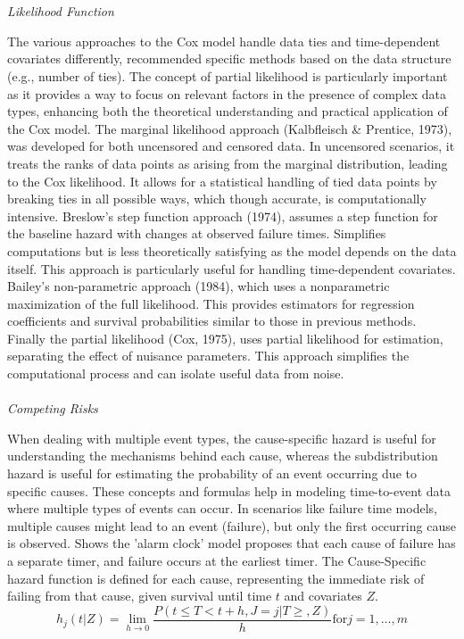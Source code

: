 \\\\
\textit{Likelihood Function}
\par \noindent The various approaches to the Cox model handle data ties and time-dependent covariates differently, \parencite{kalbfleisch_fifty_2023} recommended specific methods based on the data structure (e.g., number of ties). The concept of partial likelihood is particularly important as it provides a way to focus on relevant factors in the presence of complex data types, enhancing both the theoretical understanding and practical application of the Cox model. The marginal likelihood approach \parencite{kalbfleisch_fifty_2023} (Kalbfleisch \& Prentice, 1973), was developed for both uncensored and censored data. In uncensored scenarios, it treats the ranks of data points as arising from the marginal distribution, leading to the Cox likelihood. It allows for a statistical handling of tied data points by breaking ties in all possible ways, which though accurate, is computationally intensive. \parencite{kalbfleisch_fifty_2023} Breslow's step function approach (1974), assumes a step function for the baseline hazard with changes at observed failure times. Simplifies computations but is less theoretically satisfying as the model depends on the data itself. This approach is particularly useful for handling time-dependent covariates. \parencite{kalbfleisch_fifty_2023} Bailey's non-parametric approach (1984), which uses a nonparametric maximization of the full likelihood. This provides estimators for regression coefficients and survival probabilities similar to those in previous methods. Finally the partial likelihood \parencite{kalbfleisch_fifty_2023} (Cox, 1975), uses partial likelihood for estimation, separating the effect of nuisance parameters. This approach simplifies the computational process and can isolate useful data from noise.
\\\\
\textit{Competing Risks}
\par \noindent When dealing with multiple event types, the cause-specific hazard is useful for understanding the mechanisms behind each cause, whereas the subdistribution hazard is useful for estimating the probability of an event occurring due to specific causes. These concepts and formulas help in modeling time-to-event data where multiple types of events can occur. In scenarios like failure time models, multiple causes might lead to an event (failure), but only the first occurring cause is observed. \parencite{kalbfleisch_fifty_2023} Shows the 'alarm clock' model proposes that each cause of failure has a separate timer, and failure occurs at the earliest timer. The Cause-Specific hazard function is defined for each cause, representing the immediate risk of failing from that cause, given survival until time \(t\) and covariates \(Z\).
\begin{equation} \label{eq:spesifichazard}h_{j}(t|Z) = \lim_{h \to 0} \frac{P(t \le T < t+h, J=j|T\ge,Z)}{h} \text{for} j=1,\dots,m\end{equation}

